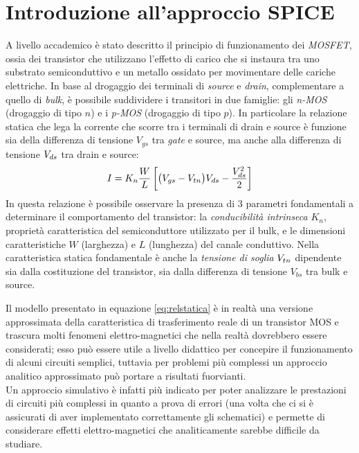 \chapter{Introduzione all'approccio SPICE}
	
	A livello accademico è stato descritto il principio di funzionamento dei \textit{MOSFET}, ossia dei transistor che utilizzano l'effetto di carico che si instaura tra uno substrato semiconduttivo e un metallo ossidato per movimentare delle cariche elettriche. In base al drogaggio dei terminali di \textit{source} e \textit{drain}, complementare a quello di \textit{bulk}, è possibile suddividere i transitori in due famiglie: gli \textit{n-MOS} (drogaggio di tipo $n$) e i \textit{p-MOS} (drogaggio di tipo $p$). In particolare la relazione statica che lega la corrente che scorre tra i terminali di drain e source è funzione sia della differenza di tensione $V_{gs}$ tra \textit{gate} e source, ma anche alla differenza di tensione $V_{ds}$ tra drain e source:
	\begin{equation} \label{eq:relstatica}
		I = K_n \frac W L \left[ \big(V_{gs} - V_{tn}\big)V_{ds} - \frac{V_{ds}^2}{2} \right]
	\end{equation} 
	In questa relazione è possibile osservare la presenza di 3 parametri fondamentali a determinare il comportamento del transistor: la \textit{conducibilità intrinseca} $K_n$, proprietà caratteristica del semiconduttore utilizzato per il bulk, e le dimensioni caratteristiche $W$ (larghezza) e $L$ (lunghezza) del canale conduttivo. Nella caratteristica statica fondamentale è anche la \textit{tensione di soglia} $V_{tn}$ dipendente sia dalla costituzione del transistor, sia dalla differenza di tensione $V_{bs}$ tra bulk e source. 
	
	Il modello presentato in equazione \ref{eq:relstatica} è in realtà una versione approssimata della caratteristica di trasferimento reale di un transistor MOS e trascura molti fenomeni elettro-magnetici che nella realtà dovrebbero essere considerati; esso può essere utile a livello didattico per concepire il funzionamento di alcuni circuiti semplici, tuttavia per problemi più complessi un approccio analitico approssimato può portare a risultati fuorvianti. \\
	Un approccio simulativo è infatti più indicato per poter analizzare le prestazioni di circuiti più complessi in quanto a prova di errori (una volta che ci si è assicurati di aver implementato correttamente gli schematici) e permette di considerare effetti elettro-magnetici che analiticamente sarebbe difficile da studiare.
	
